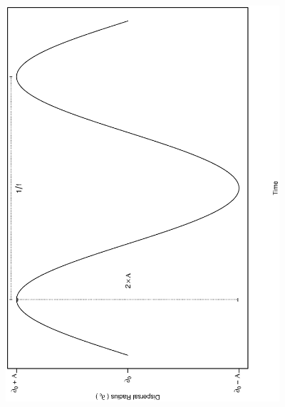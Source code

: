 \documentclass[12pt]{article}
\begin{document}
\begin{figure}[hb!]
\includegraphics[width=4in, angle=-90]{./figures/BasisForEquation.eps}
\caption{}
\label{fig:Figure3}
\end{figure}
\end{document}
